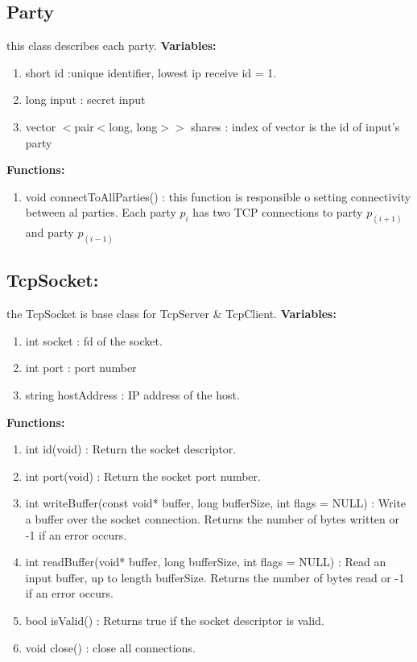 \documentclass[12pt]{article}
\begin{document}
\subsection{Party}
this class describes each party.\hfill\break
\textbf{Variables:}
\begin{enumerate}
	\item 	short id :unique identifier, lowest ip receive id = 1. 
	\item long input : secret input 
	\item vector $<$pair$<$long, long$>>$ shares : index of vector is the id of input's party
\end{enumerate}
\textbf{Functions:}
\begin{enumerate}
	\item void connectToAllParties() : this function is responsible o setting connectivity between al parties. Each party $p_i$ has two TCP connections to party $p_{(i+1)}$ and party $p_{(i-1)}$ 
\end{enumerate}


\subsection{TcpSocket:}
the TcpSocket is base class for TcpServer \& TcpClient.\hfill\break
\textbf{Variables:}
\begin{enumerate}
	\item int socket : fd of the socket.
	\item int port : port number
	\item string hostAddress : IP address of the host.
\end{enumerate}
\textbf{Functions:}
\begin{enumerate}
	\item int id(void) : Return the socket descriptor.
	\item int port(void) : Return the socket port number.
	\item int writeBuffer(const void* buffer, long bufferSize, int flags = NULL) : Write a buffer over the socket connection.  Returns the number of bytes written or -1 if an error occurs.
	
	\item int readBuffer(void* buffer, long bufferSize, int flags = NULL) :  Read an input buffer, up to length bufferSize.  Returns the number of bytes read or -1 if an error occurs.
	
	\item bool isValid() : Returns true if the socket descriptor is valid.
	
	\item void close() : close all connections.
\end{enumerate}
\end{document}

